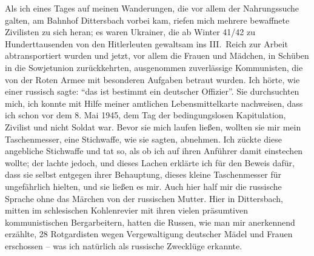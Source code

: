 Als ich eines Tages auf meinen Wanderungen, die vor allem der Nahrungssuche galten, am Bahnhof Dittersbach vorbei kam, riefen mich mehrere bewaffnete Zivilisten zu sich heran; es waren Ukrainer, die ab Winter 41/42 zu Hunderttausenden von den Hitlerleuten gewaltsam ins \mbox{III. Reich} zur Arbeit abtransportiert wurden  und jetzt, vor allem die Frauen und Mädchen, in Schüben in die Sowjetunion zurückkehrten, ausgenommen zuverlässige Kommunisten, die von der Roten Armee mit besonderen Aufgaben betraut wurden. Ich hörte, wie einer russisch sagte: \enquote{das ist bestimmt ein deutscher Offizier}. Sie durchsuchten mich, ich konnte mit Hilfe meiner amtlichen Lebensmittelkarte nachweisen, dass ich schon vor dem 8. Mai 1945, dem Tag der bedingungslosen Kapitulation, Zivilist und nicht Soldat war. Bevor sie mich laufen ließen, wollten sie mir mein Taschenmesser, eine Stichwaffe, wie sie sagten, abnehmen. Ich zückte diese angebliche Stichwaffe und tat so, als ob ich auf ihren Anführer damit einstechen wollte; der lachte jedoch, und dieses Lachen erklärte ich für den Beweis dafür, dass sie selbst entgegen ihrer Behauptung, dieses kleine Taschenmesser für ungefährlich hielten, und sie ließen es mir. Auch hier half mir die russische Sprache ohne das Märchen von der russischen Mutter. Hier in Dittersbach, mitten im schlesischen Kohlenrevier mit ihren vielen präsumtiven kommunistischen Bergarbeitern, hatten die Russen, wie man mir anerkennend erzählte, 28 Rotgardisten wegen Vergewaltigung deutscher Mädel und Frauen erschossen -- was ich natürlich als russische Zwecklüge erkannte.

